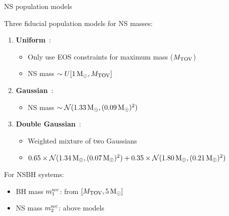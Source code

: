 \documentclass[usenames,dvipsnames,t]{beamer}
\begin{document}
\begin{frame}{NS population models}
  \def\x{3.5mm}

  Three fiducial population models for NS masses:

  \vspace{\x}

  \begin{enumerate}
    \item \textbf{Uniform}~\cite{LIGOScientific:2021qlt, Landry:2021hvl, Golomb:2024lds}:
    \begin{itemize}
      \item Only use EOS constraints for maximum mass (${M_{\rm{TOV}}}$)
      \item NS mass $\sim U[1\,\mathrm{M}_{\odot}, M_{\rm{TOV}}]$
    \end{itemize}

    \vspace{\x}

    \item \textbf{Gaussian}~\cite{Ozel:2016oaf}:
    \begin{itemize}
      \item NS mass $\sim \mathcal{N}(1.33\,\mathrm{M}_{\odot}, (0.09\,\mathrm{M}_{\odot})^2)$
    \end{itemize}

    \vspace{\x}

    \item \textbf{Double Gaussian}~\cite{Alsing:2017bbc, Shao:2020bzt}:
    \begin{itemize}
      \item Weighted mixture of two Gaussians
      \item $0.65 \times \mathcal{N}(1.34\,\mathrm{M}_{\odot}, (0.07\,\mathrm{M}_{\odot})^2) + 0.35 \times \mathcal{N}(1.80\,\mathrm{M}_{\odot}, (0.21\,\mathrm{M}_{\odot})^2)$
    \end{itemize}
  \end{enumerate}

  \vspace{\x}

  For NSBH systems:
  \begin{itemize}
    \item BH mass $m_1^{\rm{src}}$: from $[{M_{\rm{TOV}}}, 5\,\mathrm{M}_{\odot}]$
    \item NS mass $m_2^{\rm{src}}$: above models
  \end{itemize}
\end{frame}
\end{document}
